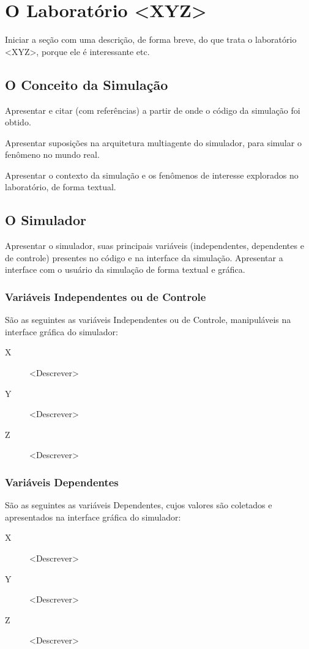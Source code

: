 \section{O Laboratório <XYZ>}

Iniciar a seção com uma descrição, de forma breve, do que trata o laboratório <XYZ>, porque ele é interessante etc.

\subsection{O Conceito da Simulação}

Apresentar e citar (com referências) a partir de onde o código da simulação foi obtido.

Apresentar suposições na arquitetura multiagente do simulador, para simular o fenômeno no mundo real.

Apresentar o contexto da simulação e os fenômenos de interesse explorados no laboratório, de forma textual.

\subsection{O Simulador}

Apresentar o simulador, suas principais variáveis (independentes, dependentes e de controle) presentes no código e na interface da simulação.
Apresentar a interface com o usuário da simulação de forma textual e gráfica.

\subsubsection{Variáveis Independentes ou de Controle}

São as seguintes as variáveis Independentes ou de Controle, manipuláveis na interface gráfica do simulador:
\begin{description}
\item [X] <Descrever>
\item [Y] <Descrever>
\item [Z] <Descrever>
\end{description}

\subsubsection{Variáveis Dependentes}

São as seguintes as variáveis Dependentes, cujos valores são coletados e apresentados na interface gráfica do simulador:
\begin{description}
\item [X] <Descrever>
\item [Y] <Descrever>
\item [Z] <Descrever>
\end{description}

